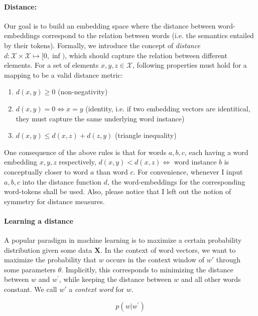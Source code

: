 \documentclass[a4paper,12pt,twoside,openright]{report}
\begin{document}
\paragraph{Distance:} Our goal is to build an embedding space where the distance between word-embeddings correspond to the relation between words (i.e. the semantics entailed by their tokens).
Formally, we introduce the concept of \textit{distance} $d : \mathcal{X}  \times \mathcal{X} \mapsto [ 0, \inf )$, which should capture the relation between different elements. 
For a set of elements $x, y, z \in \mathcal{X}$, following properties must hold for a mapping to be a valid distance metric:

\begin{enumerate}
\item $d(x, y) \geq 0$ (non-negativity)
\item $d(x, y) = 0 \iff x = y$ (identity, i.e. if two embedding vectors are identitical, they must capture the same underlying word instance)
\item $d(x, y) \leq d(x, z) + d(z, y)$ (triangle inequality)
\end{enumerate}{\label{def:distance}}

One consequence of the above rules is that for words $a, b, c$, each having a word embedding $x, y, z$ respectively, $d(x, y) < d(x, z) \iff $ word instance $b$ is conceptually closer to word $a$ than word $c$.
For convenience, whenever I input $a, b, c$ into the distance function $d$, the word-embeddings for the corresponding word-tokens shall be used.
Also, please notice that I left out the notion of symmetry for distance measures.

\paragraph{Learning a distance}
A popular paradigm in machine learning is to maximize a certain probability distribution given some data $\mathbf{X}$.
In the context of word vectors, we want to maximize the probability that $w$ occurs in the context window of $w \prime$ through some parameters $\theta$.
Implicitly, this corresponds to minimizing the distance between $w$ and $w^{\prime}$, while keeping the distance between $w$ and all other words constant. 
We call $w \prime$ a \textit{context word} for $w$.

\begin{equation}
p \left(w | w^{\prime}\right)
\end{equation}
\end{document}
